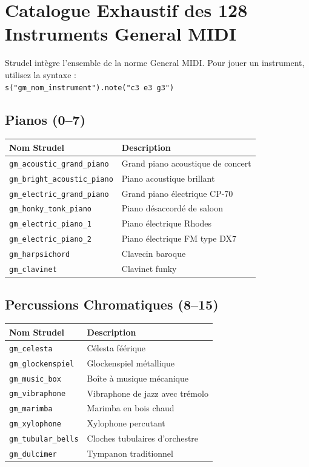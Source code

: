 \documentclass[a4paper,10pt]{article}
\begin{document}
\section{Catalogue Exhaustif des 128 Instruments General MIDI}
Strudel intègre l'ensemble de la norme General MIDI. Pour jouer un instrument, utilisez la syntaxe :\\
\texttt{s("gm\_nom\_instrument").note("c3 e3 g3")}

\subsection{Pianos (0--7)}
\begin{tabularx}{\linewidth}{|l|X|}
\hline
\textbf{Nom Strudel} & \textbf{Description} \\
\hline
\texttt{gm\_acoustic\_grand\_piano} & Grand piano acoustique de concert \\
\texttt{gm\_bright\_acoustic\_piano} & Piano acoustique brillant \\
\texttt{gm\_electric\_grand\_piano} & Grand piano électrique CP-70 \\
\texttt{gm\_honky\_tonk\_piano} & Piano désaccordé de saloon \\
\texttt{gm\_electric\_piano\_1} & Piano électrique Rhodes \\
\texttt{gm\_electric\_piano\_2} & Piano électrique FM type DX7 \\
\texttt{gm\_harpsichord} & Clavecin baroque \\
\texttt{gm\_clavinet} & Clavinet funky \\
\hline
\end{tabularx}

\subsection{Percussions Chromatiques (8--15)}
\begin{tabularx}{\linewidth}{|l|X|}
\hline
\textbf{Nom Strudel} & \textbf{Description} \\
\hline
\texttt{gm\_celesta} & Célesta féérique \\
\texttt{gm\_glockenspiel} & Glockenspiel métallique \\
\texttt{gm\_music\_box} & Boîte à musique mécanique \\
\texttt{gm\_vibraphone} & Vibraphone de jazz avec trémolo \\
\texttt{gm\_marimba} & Marimba en bois chaud \\
\texttt{gm\_xylophone} & Xylophone percutant \\
\texttt{gm\_tubular\_bells} & Cloches tubulaires d'orchestre \\
\texttt{gm\_dulcimer} & Tympanon traditionnel \\
\hline
\end{tabularx}
\end{document}
